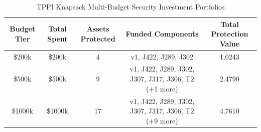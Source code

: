 \begin{table}[htbp]
\centering
\caption{TPPI Knapsack Multi-Budget Security Investment Portfolios}
\label{tab:tppi_multibudget}
\begin{tabular}{ccccc}
\toprule
Budget Tier & Total Spent & Assets Protected & Funded Components & Total Protection Value \\
\midrule
\$200k & \$200k & 4 & v1, J422, J289, J302 & 1.0243 \\
\$500k & \$500k & 9 & v1, J422, J289, J302, J307, J317, J306, T2 (+1 more) & 2.4790 \\
\$1000k & \$1000k & 17 & v1, J422, J289, J302, J307, J317, J306, T2 (+9 more) & 4.7610 \\
\bottomrule
\end{tabular}
\end{table}
